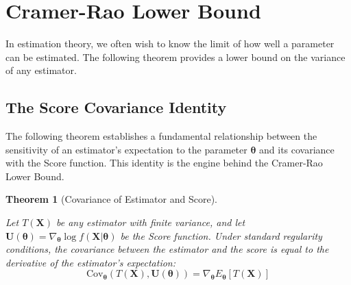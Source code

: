 \documentclass[
  letterpaper,
  DIV=11,
  numbers=noendperiod]{scrreprt}
\renewcommand{\[}{\begin{equation}}
\renewcommand{\]}{\end{equation}}
\theoremstyle{definition}
\theoremstyle{plain}
\theoremstyle{plain}
\theoremstyle{plain}
\newtheorem{theorem}{Theorem}[chapter]
\theoremstyle{definition}
\theoremstyle{plain}
\theoremstyle{remark}
\begin{document}
\section{Cramer-Rao Lower Bound}\label{cramer-rao-lower-bound}

In estimation theory, we often wish to know the limit of how well a
parameter can be estimated. The following theorem provides a lower bound
on the variance of any estimator.

\subsection{The Score Covariance
Identity}\label{the-score-covariance-identity}

The following theorem establishes a fundamental relationship between the
sensitivity of an estimator's expectation to the parameter
\(\boldsymbol{\theta}\) and its covariance with the Score function. This
identity is the engine behind the Cramer-Rao Lower Bound.

\begin{theorem}[Covariance of Estimator and
Score]\protect\hypertarget{thm-score-covariance}{}\label{thm-score-covariance}

Let \(T(\mathbf{X})\) be any estimator with finite variance, and let
\(\mathbf{U}(\boldsymbol{\theta}) = \nabla_{\boldsymbol{\theta}} \log f(\mathbf{X}|\boldsymbol{\theta})\)
be the Score function. Under standard regularity conditions, the
covariance between the estimator and the score is equal to the
derivative of the estimator's expectation: \[
\text{Cov}_{\boldsymbol{\theta}}(T(\mathbf{X}), \mathbf{U}(\boldsymbol{\theta})) = \nabla_{\boldsymbol{\theta}} E_{\boldsymbol{\theta}}[T(\mathbf{X})]
\]

\end{theorem}
\end{document}
